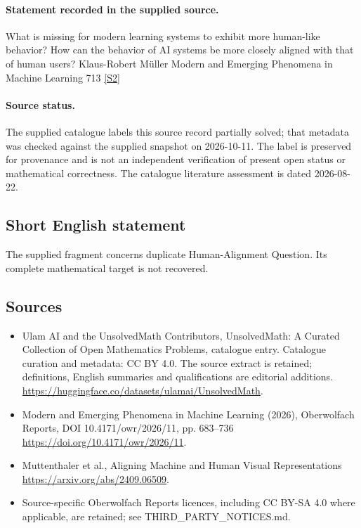\documentclass[11pt]{article}
\newcommand{\sref}[2]{\hyperlink{source:#1:#2}{[S#2]}}
\begin{document}
\paragraph{Statement recorded in the supplied source.}
What is missing for modern learning systems to exhibit more human-like behavior? How can the behavior of AI systems be more closely aligned with that of human users? Klaus-Robert Müller Modern and Emerging Phenomena in Machine Learning 713 \sref{statement}{2}
\paragraph{Source status.}
The supplied catalogue labels this source record partially solved; that metadata was checked against the supplied snapshot on 2026-10-11. The label is preserved for provenance and is not an independent verification of present open status or mathematical correctness. The catalogue literature assessment is dated 2026-08-22.
\subsection{Short English statement}
The supplied fragment concerns duplicate Human-Alignment Question. Its complete mathematical target is not recovered.
\subsection{Sources}
\begin{itemize}
\item[\hypertarget{source:statement:1}{S1}] Ulam AI and the UnsolvedMath Contributors, UnsolvedMath: A Curated Collection of Open Mathematics Problems, catalogue entry. Catalogue curation and metadata: CC BY 4.0. The source extract is retained; definitions, English summaries and qualifications are editorial additions.
\url{https://huggingface.co/datasets/ulamai/UnsolvedMath}.
\item[\hypertarget{source:statement:2}{S2}] Modern and Emerging Phenomena in Machine Learning (2026), Oberwolfach Reports, DOI 10.4171/owr/2026/11, pp. 683--736
\url{https://doi.org/10.4171/owr/2026/11}.
\item[\hypertarget{source:statement:3}{S3}] Muttenthaler et al., Aligning Machine and Human Visual Representations
\url{https://arxiv.org/abs/2409.06509}.
\item Source-specific Oberwolfach Reports licences, including CC BY-SA 4.0 where applicable, are retained; see THIRD\_PARTY\_NOTICES.md.
\end{itemize}
\end{document}

